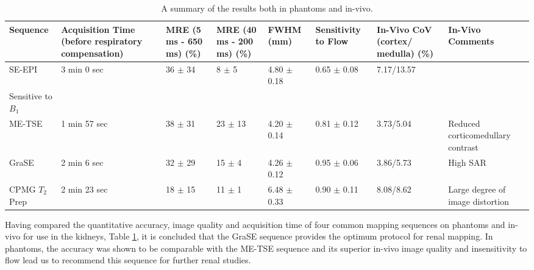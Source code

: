 \begin{table}[H]
	\centering
	\begin{adjustbox}{width=1.0\textwidth, center}
		\begin{tabularx}{1.6\textwidth}{X|X|X|X|X|X|X|X}
			Sequence        & Acquisition Time  \scriptsize{(before respiratory compensation)} & MRE  (5 ms - 650 ms) (\%) & MRE  (40 ms - 200 ms) (\%) & FWHM (mm)       & Sensitivity to Flow & In-Vivo CoV (cortex/ medulla) (\%) & In-Vivo Comments                                                        \\ \hline
			SE-EPI          & 3 min 0 sec                                                      & 36 $\pm$ 34               & 8 $\pm$ 5                  & 4.80 $\pm$ 0.18 & 0.65 $\pm$  0.08    & 7.17/13.57                        & \begin{tabular}[c]{@{}l@{}}Inaccurate\\ Sensitive to $B_1$\end{tabular} \\ \hline
			ME-TSE          & 1 min 57 sec                                                     & 38 $\pm$ 31               & 23 $\pm$ 13                & 4.20 $\pm$ 0.14 & 0.81 $\pm$ 0.12     & 3.73/5.04                         & Reduced corticomedullary contrast                                       \\ \hline
			GraSE           & 2 min 6 sec                                                      & 32 $\pm$ 29               & 15 $\pm$ 4                 & 4.26 $\pm$ 0.12 & 0.95 $\pm$ 0.06     & 3.86/5.73                         & High SAR                                                                \\ \hline
			CPMG $T_2$ Prep & 2 min 23 sec                                                     & 18 $\pm$ 15               & 11 $\pm$ 1                 & 6.48 $\pm$ 0.33 & 0.90 $\pm$ 0.11     & 8.08/8.62                         & Large degree of image distortion                                  
		\end{tabularx}
	\end{adjustbox}
	\caption{A summary of the results both in phantoms and in-vivo.}
	\label{tab:t2_results_summary}
\end{table}

Having compared the quantitative accuracy, image quality and acquisition time of four common \ttwo mapping sequences on phantoms and in-vivo for use in the kidneys, Table \ref{tab:t2_results_summary}, it is concluded that the \ac{GraSE} sequence provides the optimum protocol for renal \ttwo mapping. In phantoms, the accuracy was shown to be comparable with the \ac{ME-TSE} sequence and its superior in-vivo image quality and insensitivity to flow lead us to recommend this sequence for further renal studies.

